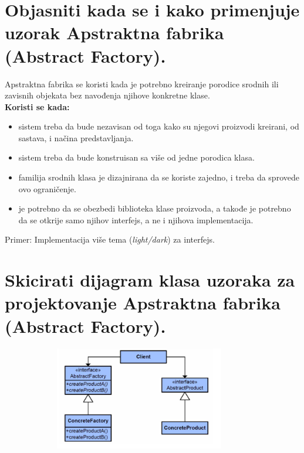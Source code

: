 \documentclass[a4paper]{article}
\begin{document}
\section{Objasniti kada se i kako primenjuje uzorak Apstraktna fabrika (Abstract Factory).}
  Apstraktna fabrika se koristi kada je potrebno kreiranje porodice srodnih ili zavisnih objekata
  bez navođenja njihove konkretne klase. \\
  \textbf{Koristi se kada:}
  \begin{itemize}
    \item sistem treba da bude nezavisan od toga kako su njegovi proizvodi kreirani, 
          od sastava, i načina predstavljanja.
    \item sistem treba da bude konstruisan sa više od jedne porodica klasa.
    \item familija srodnih klasa je dizajnirana da se koriste zajedno, 
          i treba da sprovede ovo ograničenje.
    \item je potrebno da se obezbedi biblioteka klase proizvoda, 
          a takođe je potrebno da se otkrije samo njihov interfejs, 
          a ne i njihova implementacija.
  \end{itemize}

  Primer: Implementacija više tema (\textit{light/dark}) za interfejs. \cite{medium_abstractfactory}

\section{Skicirati dijagram klasa uzoraka za projektovanje Apstraktna fabrika (Abstract Factory).}
  \begin{figure}[H]
    \begin{center}
        \includegraphics[width=100mm,height=45mm]{Slike/dp_abstract_factory.png}
    \end{center}
  \end{figure} 
\end{document}
